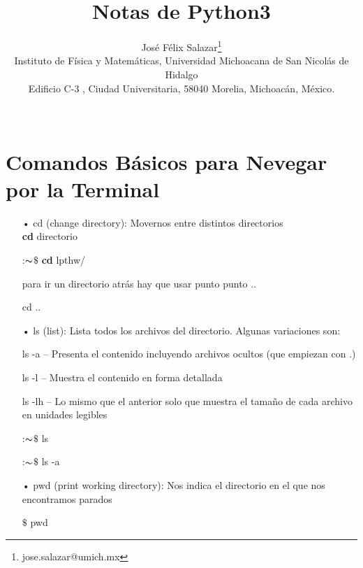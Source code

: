 \documentclass[12pt,openany]{scrbook}
\title{Notas de Python3}
\author
{Jos\'e F\'elix Salazar\footnote{jose.salazar@umich.mx}
\\
\normalsize{%
Instituto de F\'isica y Matem\'aticas, Universidad Michoacana de San Nicol\'as de Hidalgo}\\
\normalsize{Edificio C-3 , Ciudad Universitaria, 58040 Morelia, Michoac\'an, M\'exico.}\\
\\
}
\begin{document}
 

\maketitle

\section{Comandos B\'asicos para Nevegar por la Terminal}

\begin{itemize}

\item[•] cd (change directory): Movernos entre distintos directorios\\

\hspace{1cm}	\textbf{cd} directorio

\hspace{1cm}	:$\thicksim$\vspace{0cm}$\$$ \textbf{cd} lpthw/	

para ir un directorio atr\'as hay que usar punto punto .. 

\hspace{1cm}	 cd ..

\item[•] ls (list): Lista todos los archivos del directorio. Algunas variaciones son:

\hspace{1cm} ls -a -- Presenta el contenido incluyendo archivos ocultos (que empiezan con .) 

\hspace{1cm} ls -l -- Muestra el contenido en forma detallada

\hspace{1cm} ls -lh -- Lo mismo que el anterior solo que muestra el tama\~no de cada archivo en
unidades legibles

\hspace{1cm}	:$\thicksim$\vspace{0cm}$\$$ ls

\hspace{1cm}	:$\thicksim$\vspace{0cm}$\$$ ls -a


\item[•] pwd (print working directory): Nos indica el directorio en el que nos encontramos
parados

\hspace{1cm}	$\$$ pwd \\


\end{itemize}
\end{document}
